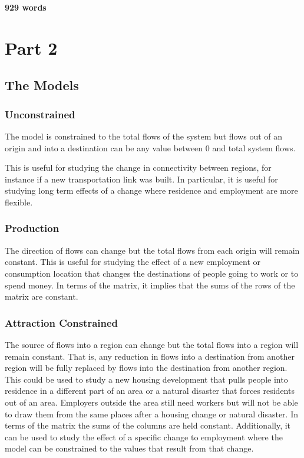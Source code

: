 \documentclass[11pt]{article} %
\begin{document}
\textbf{929 words}


\pagebreak

\section{Part 2}

\subsection{The Models}

\subsubsection{Unconstrained}

The model is constrained to the total flows of the system but flows out of an origin and into a destination can be any value between 0 and total system flows. 

This is useful for studying the change in connectivity between regions, for instance if a new transportation link was built. In particular, it is useful for studying long term effects of a change where residence and employment are more flexible. 

\subsubsection{Production}

The direction of flows can change but the total flows from each origin will remain constant. This is useful for studying the effect of a new employment or consumption location that changes the destinations of people going to work or to spend money. In terms of the matrix, it implies that the sums of the rows of the matrix are constant. 

\subsubsection{Attraction Constrained}

The source of flows into a region can change but the total flows into a region will remain constant. That is, any reduction in flows into a destination from another region will be fully replaced by flows into the destination from another region.  This could be used to study a new housing development that pulls people into residence in a different part of an area or a natural disaster that forces residents out of an area. Employers outside the area still need workers but will not be able to draw them from the same places after a housing change or natural disaster. In terms of the matrix the sums of the columns are held constant. Additionally, it can be used to study the effect of a specific change to employment where the model can be constrained to the values that result from that change. 
\end{document}
